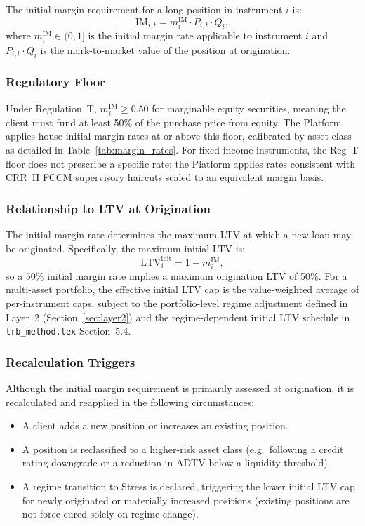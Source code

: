 \documentclass[12pt, a4paper]{article}
\newcommand{\IM}{\mathrm{IM}}
\newcommand{\LTV}{\mathrm{LTV}}
\begin{document}
The initial margin requirement for a long position in instrument $i$ is:
\begin{equation}
    \IM_{i,t} = m_i^{\IM} \cdot P_{i,t} \cdot Q_i,
    \label{eq:initial_margin}
\end{equation}
where $m_i^{\IM} \in (0,1]$ is the initial margin rate applicable to
instrument $i$ and $P_{i,t} \cdot Q_i$ is the mark-to-market value of
the position at origination.

\subsubsection*{Regulatory Floor}
Under Regulation~T, $m_i^{\IM} \geq 0.50$ for marginable equity securities,
meaning the client must fund at least 50\% of the purchase price from equity.
The Platform applies house initial margin rates at or above this floor,
calibrated by asset class as detailed in Table~\ref{tab:margin_rates}.
For fixed income instruments, the Reg~T floor does not prescribe a specific
rate; the Platform applies rates consistent with CRR~II FCCM supervisory
haircuts scaled to an equivalent margin basis.

\subsubsection*{Relationship to LTV at Origination}
The initial margin rate determines the maximum LTV at which a new loan may
be originated. Specifically, the maximum initial LTV is:
\begin{equation}
    \LTV^{\mathrm{init}}_i = 1 - m_i^{\IM},
    \label{eq:ltv_init}
\end{equation}
so a 50\% initial margin rate implies a maximum origination LTV of 50\%.
For a multi-asset portfolio, the effective initial LTV cap is the
value-weighted average of per-instrument caps, subject to the portfolio-level
regime adjustment defined in Layer~2 (Section~\ref{sec:layer2}) and the
regime-dependent initial LTV schedule in \texttt{trb\_method.tex} Section~5.4.

\subsubsection*{Recalculation Triggers}
Although the initial margin requirement is primarily assessed at origination,
it is recalculated and reapplied in the following circumstances:
\begin{itemize}[leftmargin=1.5em]
    \item A client adds a new position or increases an existing position.
    \item A position is reclassified to a higher-risk asset class (e.g.\
    following a credit rating downgrade or a reduction in ADTV below a
    liquidity threshold).
    \item A regime transition to Stress is declared, triggering the lower
    initial LTV cap for newly originated or materially increased positions
    (existing positions are not force-cured solely on regime change).
\end{itemize}
\end{document}

